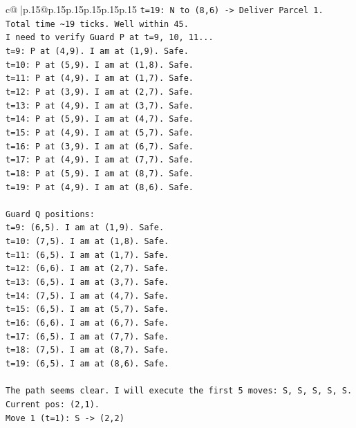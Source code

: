 \documentclass{article}
\begin{document}
{\begin{supertabular}{c@{$\;$}|p{.15\linewidth}@{}p{.15\linewidth}p{.15\linewidth}p{.15\linewidth}p{.15\linewidth}p{.15\linewidth}}
{{{\texttt{t=19: N to (8,6) {-}> Deliver Parcel 1.} \\
\texttt{Total time \textasciitilde{}19 ticks. Well within 45.} \\
\texttt{I need to verify Guard P at t=9, 10, 11...} \\
\texttt{t=9: P at (4,9). I am at (1,9). Safe.} \\
\texttt{t=10: P at (5,9). I am at (1,8). Safe.} \\
\texttt{t=11: P at (4,9). I am at (1,7). Safe.} \\
\texttt{t=12: P at (3,9). I am at (2,7). Safe.} \\
\texttt{t=13: P at (4,9). I am at (3,7). Safe.} \\
\texttt{t=14: P at (5,9). I am at (4,7). Safe.} \\
\texttt{t=15: P at (4,9). I am at (5,7). Safe.} \\
\texttt{t=16: P at (3,9). I am at (6,7). Safe.} \\
\texttt{t=17: P at (4,9). I am at (7,7). Safe.} \\
\texttt{t=18: P at (5,9). I am at (8,7). Safe.} \\
\texttt{t=19: P at (4,9). I am at (8,6). Safe.} \\
\\ 
\texttt{Guard Q positions:} \\
\texttt{t=9: (6,5). I am at (1,9). Safe.} \\
\texttt{t=10: (7,5). I am at (1,8). Safe.} \\
\texttt{t=11: (6,5). I am at (1,7). Safe.} \\
\texttt{t=12: (6,6). I am at (2,7). Safe.} \\
\texttt{t=13: (6,5). I am at (3,7). Safe.} \\
\texttt{t=14: (7,5). I am at (4,7). Safe.} \\
\texttt{t=15: (6,5). I am at (5,7). Safe.} \\
\texttt{t=16: (6,6). I am at (6,7). Safe.} \\
\texttt{t=17: (6,5). I am at (7,7). Safe.} \\
\texttt{t=18: (7,5). I am at (8,7). Safe.} \\
\texttt{t=19: (6,5). I am at (8,6). Safe.} \\
\\ 
\texttt{The path seems clear. I will execute the first 5 moves: S, S, S, S, S.} \\
\texttt{Current pos: (2,1).} \\
\texttt{Move 1 (t=1): S {-}> (2,2)} \\
}}}
\end{supertabular}}
\end{document}
